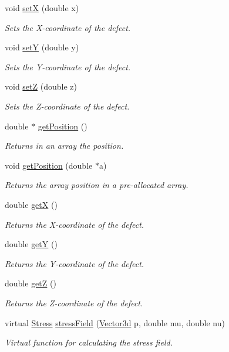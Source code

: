 \begin{DoxyCompactItemize}
void \hyperlink{classDefect_a5a65f73da6a572d9e7109b31239e441d}{set\-X} (double x)
\begin{DoxyCompactList}\small\item\em Sets the X-\/coordinate of the defect. \end{DoxyCompactList}\item 
void \hyperlink{classDefect_a268606391a4eaee3de029d2005648b6f}{set\-Y} (double y)
\begin{DoxyCompactList}\small\item\em Sets the Y-\/coordinate of the defect. \end{DoxyCompactList}\item 
void \hyperlink{classDefect_abb0b16c44a1b04d782f5c5f598b49d5b}{set\-Z} (double z)
\begin{DoxyCompactList}\small\item\em Sets the Z-\/coordinate of the defect. \end{DoxyCompactList}\item 
double $\ast$ \hyperlink{classDefect_a6842fba3ad14032766ccf0437afcbced}{get\-Position} ()
\begin{DoxyCompactList}\small\item\em Returns in an array the position. \end{DoxyCompactList}\item 
void \hyperlink{classDefect_aace5c752b85c368631746abc3d5bd714}{get\-Position} (double $\ast$a)
\begin{DoxyCompactList}\small\item\em Returns the array position in a pre-\/allocated array. \end{DoxyCompactList}\item 
double \hyperlink{classDefect_a01b96c453c13db82b5835682e1849dc0}{get\-X} ()
\begin{DoxyCompactList}\small\item\em Returns the X-\/coordinate of the defect. \end{DoxyCompactList}\item 
double \hyperlink{classDefect_a9ea8df3b4c621762a327813056e63911}{get\-Y} ()
\begin{DoxyCompactList}\small\item\em Returns the Y-\/coordinate of the defect. \end{DoxyCompactList}\item 
double \hyperlink{classDefect_a6f59edeca7ca8bfa01c54fd6b1a62374}{get\-Z} ()
\begin{DoxyCompactList}\small\item\em Returns the Z-\/coordinate of the defect. \end{DoxyCompactList}\item 
virtual \hyperlink{classStress}{Stress} \hyperlink{classDefect_a5730a89ce804d75090c9fa35ffdfefa2}{stress\-Field} (\hyperlink{classVector3d}{Vector3d} p, double mu, double nu)
\begin{DoxyCompactList}\small\item\em Virtual function for calculating the stress field. \end{DoxyCompactList}\end{DoxyCompactItemize}
